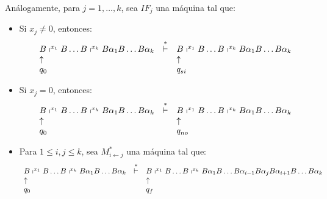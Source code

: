 \begin{frame}
  \PN Análogamente, para $j=1,\dotsc,k$, sea $IF_{j}$ una máquina tal que:
  \begin{itemize}
    \item Si $x_{j} \neq 0$, entonces:
    \[
      \begin{array}{lcl}
        B \shortmid^{x_{1}} B \dotsc B \shortmid^{x_{k}} B \alpha_{1} B \dotsc B \alpha_{k} &\overset{\ast}{\vdash}& B
          \shortmid^{x_{1}} B \dotsc B \shortmid^{x_{k}} B \alpha_{1} B \dotsc B \alpha_{k} \\
        \uparrow && \uparrow \\
        q_{0} && q_{si}
      \end{array}
    \]

    \item Si $x_{j} = 0$, entonces:
    \[
      \begin{array}{lcl}
        B \shortmid^{x_{1}} B \dotsc B \shortmid^{x_{k}} B \alpha_{1} B \dotsc B \alpha_{k} &\overset{\ast}{\vdash}& B
          \shortmid^{x_{1}} B \dotsc B \shortmid^{x_{k}} B \alpha_{1} B \dotsc B \alpha_{k} \\
        \uparrow && \uparrow \\
        q_{0} && q_{no}
      \end{array}
    \]

    \item Para $1 \leq i,j \leq k$, sea $M_{i\leftarrow j}^{\ast}$ una máquina tal que:
    \[
      \begin{array}{lcl}
        B \shortmid^{x_{1}} B \dotsc B \shortmid^{x_{k}} B \alpha_{1} B \dotsc B \alpha_{k} &\overset{\ast}{\vdash}& B
          \shortmid^{x_{1}} B \dotsc B \shortmid^{x_{k}} B \alpha_{1} B \dotsc B \alpha_{i-1} B \alpha_{j} B
          \alpha_{i+1} B \dotsc B \alpha_{k} \\
        \uparrow && \uparrow \\
        q_{0} & & q_{f}
      \end{array}
    \]
  \end{itemize}
\end{frame}
